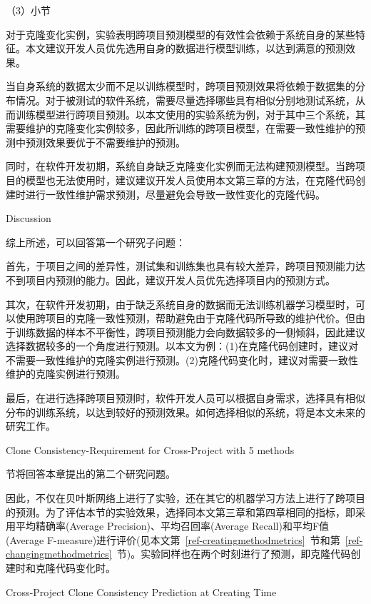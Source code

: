 （3）小节

对于克隆变化实例，实验表明跨项目预测模型的有效性会依赖于系统自身的某些特征。本文建议开发人员优先选用自身的数据进行模型训练，以达到满意的预测效果。

当自身系统的数据太少而不足以训练模型时，跨项目预测效果将依赖于数据集的分布情况。对于被测试的软件系统，需要尽量选择哪些具有相似分别地测试系统，从而训练模型进行跨项目预测。以本文使用的实验系统为例，对于其中三个系统，其需要维护的克隆变化实例较多，因此所训练的跨项目模型，在需要一致性维护的预测中预测效果要优于不需要维护的预测。

同时，在软件开发初期，系统自身缺乏克隆变化实例而无法构建预测模型。当跨项目的模型也无法使用时，建议建议开发人员使用本文第三章的方法，在克隆代码创建时进行一致性维护需求预测，尽量避免会导致一致性变化的克隆代码。

{Discussion}

综上所述，可以回答第一个研究子问题：

首先，于项目之间的差异性，测试集和训练集也具有较大差异，跨项目预测能力达不到项目内预测的能力。因此，建议开发人员优先选择项目内的预测方式。

其次，在软件开发初期，由于缺乏系统自身的数据而无法训练机器学习模型时，可以使用跨项目的克隆一致性预测，帮助避免由于克隆代码所导致的维护代价。但由于训练数据的样本不平衡性，跨项目预测能力会向数据较多的一侧倾斜，因此建议选择数据较多的一个角度进行预测。以本文为例：(1)在克隆代码创建时，建议对不需要一致性维护的克隆实例进行预测。(2)克隆代码变化时，建议对需要一致性维护的克隆实例进行预测。

最后，在进行选择跨项目预测时，软件开发人员可以根据自身需求，选择具有相似分布的训练系统，以达到较好的预测效果。如何选择相似的系统，将是本文未来的研究工作。

{Clone Consistency-Requirement for Cross-Project with 5 methods}

节将回答本章提出的第二个研究问题。

因此，不仅在贝叶斯网络上进行了实验，还在其它的机器学习方法上进行了跨项目的预测。为了评估本节的实验效果，选择同本文第三章和第四章相同的指标，即采用平均精确率(Average Precision)、平均召回率(Average Recall)和平均F值(Average F-measure)进行评价(见本文第~\ref{ref-creatingmethodmetrics}~节和第~\ref{ref-changingmethodmetrics}~节)。实验同样也在两个时刻进行了预测，即克隆代码创建时和克隆代码变化时。

{Cross-Project Clone Consistency Prediction at Creating Time}

